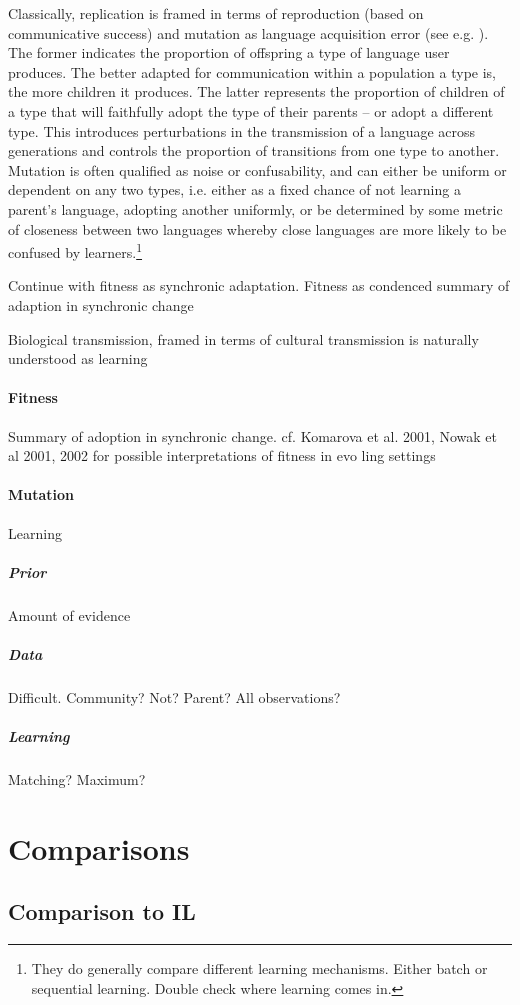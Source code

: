 \documentclass[12pt]{article}
\newcommand{\hloranj}[1]{\textcolor[rgb]{.8,.33,.0}{#1}}%
\begin{document}
Classically, replication is framed in terms of reproduction (based on communicative success) and mutation as language acquisition error (see e.g. \citealt{komarova+etal:2001,nowak+etal:2001, nowak+etal:2002,hutteger+zollman:2013}). The former indicates the proportion of offspring a type of language user produces. The better adapted for communication within a population a type is, the more children it produces. The latter represents the proportion of children of a type that will faithfully adopt the type of their parents -- or adopt a different type. This introduces perturbations in the transmission of a language across generations and controls the proportion of transitions from one type to another. Mutation is often qualified as noise or confusability, and can either be uniform or dependent on any two types, i.e. either as a fixed chance of not learning a parent's language, adopting another uniformly, or be determined by some metric of closeness between two languages whereby close languages are more likely to be confused by learners.\footnote{\hloranj{They do generally compare different learning mechanisms. Either batch or sequential learning. Double check where learning comes in.}}

\hloranj{Continue with fitness as synchronic adaptation. Fitness as condenced summary of adaption in synchronic change}

\hloranj{Biological transmission, framed in terms of cultural transmission is naturally understood as learning}



\paragraph{Fitness} Summary of adoption in synchronic change. \hloranj{cf. Komarova et al. 2001, Nowak et al 2001, 2002 for possible interpretations of fitness in evo ling settings}
\paragraph{Mutation} Learning

\subparagraph{Prior} Amount of evidence
\subparagraph{Data} Difficult. Community? Not? Parent? All observations?
\subparagraph{Learning} Matching? Maximum?

\section{Comparisons}
\subsection{Comparison to IL}
\end{document}
